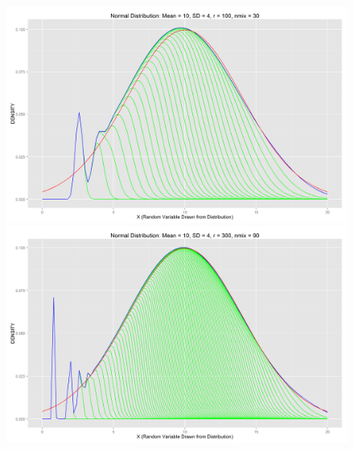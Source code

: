 \documentclass[letter]{article}
\begin{document}
\begin{figure}[H]
\includegraphics[scale=.27]{normdist_10_4_100_30.png}\\
\includegraphics[scale=.54]{normdist_10_4_300_90.png}
\end{figure}

\newpage
\end{document}
